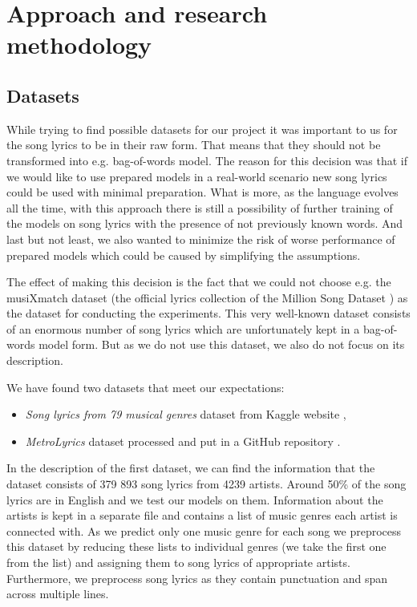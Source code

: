 \section{Approach and research methodology}\label{approach}

\subsection{Datasets}\label{datasets}
While trying to find possible datasets for our project it was important to us for the song lyrics to be in their raw form. That means that they should not be transformed into e.g. bag-of-words model. The reason for this decision was that if we would like to use prepared models in a real-world scenario new song lyrics could be used with minimal preparation. What is more, as the language evolves all the time, with this approach there is still a possibility of further training of the models on song lyrics with the presence of not previously known words. And last but not least, we also wanted to minimize the risk of worse performance of prepared models which could be caused by simplifying the assumptions.

The effect of making this decision is the fact that we could not choose e.g. the musiXmatch dataset (the official lyrics collection of the Million Song Dataset \cite{Bertin-Mahieux2011}) as the dataset for conducting the experiments. This very well-known dataset consists of an enormous number of song lyrics which are unfortunately kept in a bag-of-words model form. But as we do not use this dataset, we also do not focus on its description.

We have found two datasets that meet our expectations:
\begin{itemize}
    \item \textit{Song lyrics from 79 musical genres} dataset from Kaggle website \cite{KaggleDataset},
    \item \textit{MetroLyrics} dataset processed and put in a GitHub repository \cite{GithubDataset}.
\end{itemize}

In the description of the first dataset, we can find the information that the dataset consists of 379 893 song lyrics from 4239 artists. Around 50\% of the song lyrics are in English and we test our models on them. Information about the artists is kept in a separate file and contains a list of music genres each artist is connected with. As we predict only one music genre for each song we preprocess this dataset by reducing these lists to individual genres (we take the first one from the list) and assigning them to song lyrics of appropriate artists. Furthermore, we preprocess song lyrics as they contain punctuation and span across multiple lines.

